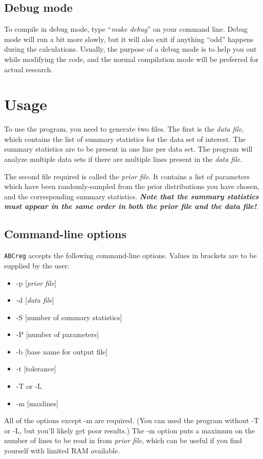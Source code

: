 \documentclass{article}
\begin{document}
\subsection*{Debug mode}
To compile in debug mode, type ``\textit{make debug}'' on your command line.  Debug mode will run a bit more slowly, but it will also exit if anything ``odd'' happens during the calculations.  Usually, the purpose of a debug mode is to help you out while modifying the code, and the normal compilation mode will be preferred for actual research.

\section*{Usage}
To use the program, you need to generate two files.  The first is the \textit{data file}, which contains the list of summary statistics for the data set of interest.  The summary statistics are to be present in one line per data set.  The program will analyze multiple data sets if there are multiple lines present in the \textit{data file}.

The second file required is called the \textit{prior file}.  It contains a list of parameters which have been randomly-sampled from the prior distributions you have chosen, and the corresponding summary statistics.  \textit{\textbf{Note that the summary statistics must appear in the same order in both the prior file and the data file!}}.

\subsection*{Command-line options}
\texttt{ABCreg} accepts the following command-line options.  Values in brackets are to be supplied by the user:
\begin{itemize}
\item -p [\textit{prior file}]
\item -d [\textit{data file}]
\item -S [number of summary statistics]
\item -P [number of parameters]
\item -b [base name for output file]
\item -t [tolerance]
\item -T or -L
\item -m [maxlines] 
\end{itemize}

All of the options except -m are required.  (You can used the program without -T or -L, but you'll likely get poor results.)  The -m option puts a maximum on the number of lines to be read in from \textit{prior file}, which can be useful if you find yourself with limited RAM available.
\end{document}
